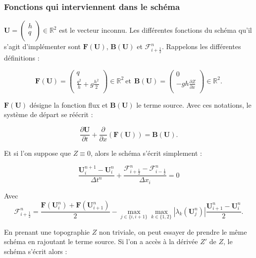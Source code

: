 \documentclass[
11pt, %
francais, %
singlespacing, %
headsepline, %
]{MastersDoctoralThesis} %
\begin{document}
    \hypertarget{fonctions-qui-interviennent-dans-le-schuxe9ma}{%
\subsubsection*{Fonctions qui interviennent dans le
schéma}\label{fonctions-qui-interviennent-dans-le-schuxe9ma}}

\(\textbf{U}= \begin{pmatrix}  h \\  q \\ \end{pmatrix} \in\mathbb{R}^{2}\)
est le vecteur inconnu. Les différentes fonctions du schéma qu'il s'agit
d'implémenter sont \(\textbf{F}(\textbf{U})\),
\(\textbf{B}(\textbf{U})\) et \(\mathcal{F}_{i+\frac{1}{2}}^n\).
Rappelons les différentes définitions :

\[
\textbf{F} (\textbf{U}) =
\begin{pmatrix}
   q                                \\
   \frac{q^{2}}{h}+g\frac{h^{2}}{2} \\
\end{pmatrix}\in\mathbb{R}^{2} ~
\text{et} ~~ \textbf{B} (\textbf{U}) =
\begin{pmatrix}
   0                                \\
   -gh \frac{\partial Z}{\partial x}\\
\end{pmatrix}
\in\mathbb{R}^{2}.
\]

\(\textbf{F} (\textbf{U})\) désigne la fonction flux et
\(\textbf{B} (\textbf{U})\) le terme source. Avec ces notations, le
système de départ se réécrit :

\[\frac{\partial\textbf{U}}{\partial t}+\frac{\partial}{\partial x}(\textbf{F} (\textbf{U})) = \textbf{B} (\textbf{U}).\]

Et si l'on suppose que \(Z\equiv 0\), alors le schéma s'écrit simplement
:

\[\frac{\textbf{U}_i^{n+1}-\textbf{U}_i^{n}}{\Delta t^n}+\frac{\mathcal{F}_{i+\frac{1}{2}}^n - \mathcal{F}_{i-\frac{1}{2}}^n}{\Delta x_i}=0\]

Avec
\[\mathcal{F}_{i+\frac{1}{2}}^n=\frac{\textbf{F}(\textbf{U}_i^{n})+\textbf{F}(\textbf{U}_{i+1}^{n})}{2}-\max_{j\in\{i,i+1\}}\max_{k\in\{1,2\}}|\lambda_k(\textbf{U}_j^n)|\frac{\textbf{U}_{i+1}^n-\textbf{U}_i^n}{2}.\]

En prenant une topographie \(Z\) non triviale, on peut essayer de
prendre le même schéma en rajoutant le terme source. Si l'on a accès à
la dérivée \(Z'\) de \(Z\), le schéma s'écrit alors :
\end{document}
